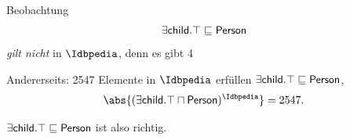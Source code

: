 \documentclass[ngerman]{beamer}
\begin{document}
\begin{frame}
  

  \begin{block}{Beobachtung}
    \begin{equation*}
      \sf \exists child. \top \sqsubseteq Person
    \end{equation*}
    \emph{gilt nicht} in $\Idbpedia$, denn es gibt 4 
    \begin{overlayarea}{\textwidth}{5ex}
    \end{overlayarea}


    \bigskip{}

    Andererseits: 2547 Elemente in $\Idbpedia$ erfüllen $\sf \exists child. \top
    \sqsubseteq \sf Person$, \dh
    \begin{equation*}
      \abs{ (\sf \exists child.\top \sqcap Person)^{\Idbpedia} } = 2547.
    \end{equation*}


    $\sf \exists child. \top \sqsubseteq Person$ ist also
     richtig.
  \end{block}

\end{frame}
\end{document}
